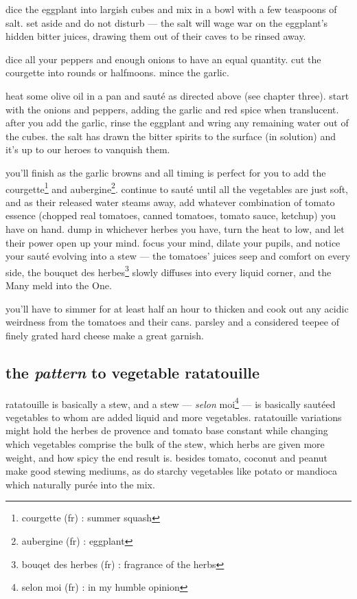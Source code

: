 dice the eggplant into largish cubes and mix in a bowl with a few teaspoons of 
salt. set aside and do not disturb --- the salt will wage war on the 
eggplant's hidden bitter juices, drawing them out of their caves to be rinsed 
away.

dice all your peppers and enough onions to have an equal quantity. cut the 
courgette into rounds or halfmoons. mince the garlic.

heat some olive oil in a pan and saut\'{e} as directed above (see chapter 
three). start with the onions and peppers, adding the garlic and red spice 
when translucent. after you add the garlic, rinse the eggplant and wring any 
remaining water out of the cubes. the salt has drawn the bitter spirits to the 
surface (in solution) and it's up to our heroes to vanquish them.

you'll finish as the garlic browns and all timing is perfect for you to add 
the courgette\footnote{courgette (fr) : summer squash} and 
aubergine\footnote{aubergine (fr) : eggplant}. continue to saut\'{e} until all 
the vegetables are just soft, and as their released water steams away, add 
whatever combination of tomato essence (chopped real tomatoes, canned 
tomatoes, tomato sauce, ketchup) you have on hand. dump in whichever herbes 
you have, turn the heat to low, and let their power open up your mind. focus 
your mind, dilate your pupils, and notice your saut\'{e} evolving into a stew 
--- the tomatoes' juices seep and comfort on every side, the bouquet des 
herbes\footnote{bouqet des herbes (fr) : fragrance of the herbs} slowly 
diffuses into every liquid corner, and the Many meld into the One. 

you'll have to simmer for at least half an hour to thicken and cook out any 
acidic weirdness from the tomatoes and their cans. parsley and a considered 
teepee of finely grated hard cheese make a great garnish.

\subsection{the \textit{pattern} to vegetable ratatouille}

ratatouille is basically a stew, and a stew --- \textit{selon} 
moi\footnote{selon moi (fr) : in my humble opinion} --- is basically 
saut\'{e}ed vegetables to whom are added liquid and more vegetables. 
ratatouille variations might hold the herbes de provence and tomato base 
constant while changing which vegetables comprise the bulk of the stew, which 
herbs are given more weight, and how spicy the end result is. besides tomato, 
coconut and peanut make good stewing mediums, as do starchy vegetables like 
potato or mandioca which naturally pur\'{e}e into the mix. 

